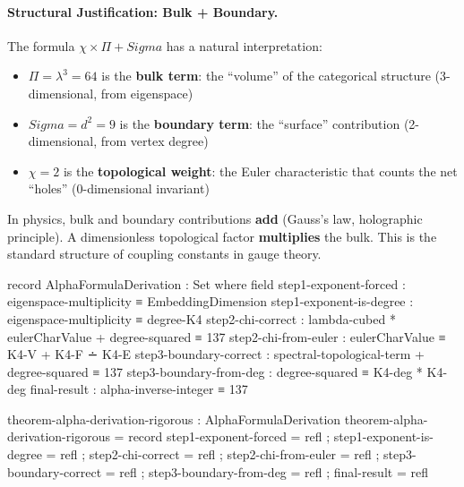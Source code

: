 \documentclass[11pt,a4paper]{book}
\def\Sigma{Sigma}%
\begin{document}

\paragraph{Structural Justification: Bulk + Boundary.}

The formula $\chi \times \Pi + \Sigma$ has a natural interpretation:

\begin{itemize}
\item $\Pi = \lambda^3 = 64$ is the \textbf{bulk term}: the ``volume'' of 
      the categorical structure (3-dimensional, from eigenspace)
\item $\Sigma = d^2 = 9$ is the \textbf{boundary term}: the ``surface'' 
      contribution (2-dimensional, from vertex degree)
\item $\chi = 2$ is the \textbf{topological weight}: the Euler characteristic 
      that counts the net ``holes'' (0-dimensional invariant)
\end{itemize}

In physics, bulk and boundary contributions \textbf{add} (Gauss's law, 
holographic principle). A dimensionless topological factor \textbf{multiplies} 
the bulk. This is the standard structure of coupling constants in gauge theory.

\begin{code}
record AlphaFormulaDerivation : Set where
  field
    step1-exponent-forced     : eigenspace-multiplicity ≡ EmbeddingDimension
    step1-exponent-is-degree  : eigenspace-multiplicity ≡ degree-K4
    step2-chi-correct         : lambda-cubed * eulerCharValue + degree-squared ≡ 137
    step2-chi-from-euler      : eulerCharValue ≡ K4-V + K4-F ∸ K4-E
    step3-boundary-correct    : spectral-topological-term + degree-squared ≡ 137
    step3-boundary-from-deg   : degree-squared ≡ K4-deg * K4-deg
    final-result              : alpha-inverse-integer ≡ 137

theorem-alpha-derivation-rigorous : AlphaFormulaDerivation
theorem-alpha-derivation-rigorous = record
  { step1-exponent-forced   = refl
  ; step1-exponent-is-degree = refl
  ; step2-chi-correct       = refl
  ; step2-chi-from-euler    = refl
  ; step3-boundary-correct  = refl
  ; step3-boundary-from-deg = refl
  ; final-result            = refl
  }
\end{code}
\end{document}
